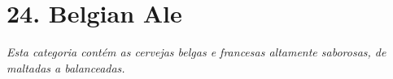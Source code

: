 \section*{24. Belgian Ale}
\textit{Esta categoria contém as cervejas belgas e francesas altamente saborosas, de maltadas a balanceadas.}

